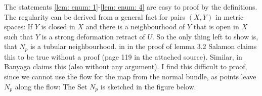     The statements \ref{lem: enum: 1}-\ref{lem: enum: 4} are easy to proof by the definitions. The regularity can be derived from a general fact for pairs $(X,Y)$ in metric spaces: If $Y$ is closed in $X$ and there is a neighbourhood of $Y$ that is open in $X$ such that $Y$ is a strong deformation retract of $U$. So the only thing left to show is, that $N_p$ is a tubular neighbourhood. in \cite{MorseTheorySalmbon} in the proof of lemma 3.2 Salamon claims this to be true without a proof (page 119 in the attached source). Similar, in \cite{banyaga2004lectures} Banyaga claims this (also without any argument).
  I find this difficult to proof, since we cannot use the flow for the map from the normal bundle, as points leave $N_p$ along the flow: The Set $N_p$ is sketched in the figure below. 
    \begin{center}
        

\end{center}
